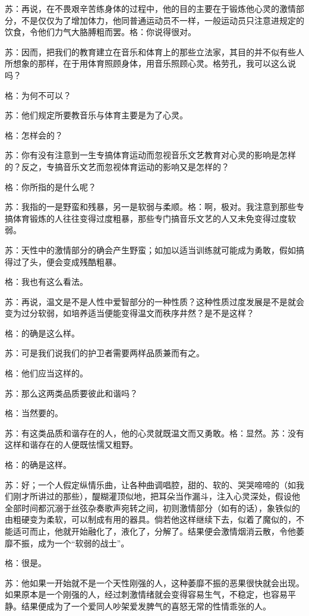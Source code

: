 \documentclass[11pt,oneside]{book}
\begin{document}
\begin{common-format}
苏：再说，在不畏艰辛苦练身体的过程中，他的目的主要在于锻炼他心灵的激情部分，不是仅仅为了增加体力，他同普通运动员不一样，一般运动员只注意进规定的饮食，令他们力气大胳膊粗而罢。格：你说得很对。

苏：因而，把我们的教育建立在音乐和体育上的那些立法家，其目的并不似有些人所想象的那样，在于用体育照顾身体，用音乐照顾心灵。格劳孔，我可以这么说吗？

格：为何不可以？

苏：他们规定所要教音乐与体育主要是为了心灵。

格：怎样会的？

苏：你有没有注意到一生专搞体育运动而忽视音乐文艺教育对心灵的影响是怎样的？反之，专搞音乐文艺而忽视体育运动的影响又是怎样的？

格：你所指的是什么呢？

苏：我指的一是野蛮和残暴，另一是软弱与柔顺。格：啊，极对。我注意到那些专搞体育锻炼的人往往变得过度粗暴，那些专门搞音乐文艺的人又未免变得过度软弱。

苏：天性中的激情部分的确会产生野蛮；如加以适当训练就可能成为勇敢，假如搞得过了头，便会变成残酷粗暴。

格：我也有这么看法。

苏：再说，温文是不是人性中爱智部分的一种性质？这种性质过度发展是不是就会变为过分软弱，如培养适当便能变得温文而秩序井然？是不是这样？

格：的确是这么样。

苏：可是我们说我们的护卫者需要两样品质兼而有之。

格：他们应当这样的。

苏：那么这两类品质要彼此和谐吗？

格：当然要的。

苏：有这类品质和谐存在的人，他的心灵就既温文而又勇敢。格：显然。苏：没有这样和谐存在的人便既怯懦又粗野。

格：的确是这样。

苏：好；一个人假定纵情乐曲，让各种曲调唱腔，甜的、软的、哭哭啼啼的（如我们刚才所讲过的那些），醍糊灌顶似地，把耳朵当作漏斗，注入心灵深处，假设他全部时间都沉溺于丝弦杂奏歌声宛转之间，初则激情部分（如有的话），象铁似的由粗硬变为柔软，可以制成有用的器具。倘若他这样继续下去，似着了魔似的，不能适可而止，他就开始融化了，液化了，分解了。结果便会激情烟消云散，令他萎靡不振，成为一个“软弱的战士”。

格：很是。

苏：他如果一开始就不是一个天性刚强的人，这种萎靡不振的恶果很快就会出现。如果原本是一个刚强的人，经过刺激情绪就会变得容易生气，不稳定，也容易平静。结果便成为了一个爱同人吵架爱发脾气的喜怒无常的性情乖张的人。


\end{common-format}
\end{document}
